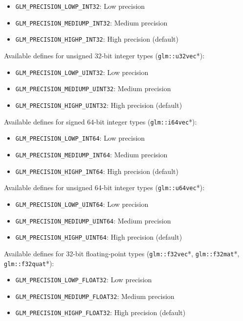 \documentclass{scrartcl}
\numberwithin{figure}{subsection}
\begin{document}
\begin{itemize}
    \item \verb|GLM_PRECISION_LOWP_INT32|: Low precision
    \item \verb|GLM_PRECISION_MEDIUMP_INT32|: Medium precision
    \item \verb|GLM_PRECISION_HIGHP_INT32|: High precision (default)
\end{itemize}

Available defines for unsigned 32-bit integer types (\verb|glm::u32vec|*):

\begin{itemize}
    \item \verb|GLM_PRECISION_LOWP_UINT32|: Low precision
    \item \verb|GLM_PRECISION_MEDIUMP_UINT32|: Medium precision
    \item \verb|GLM_PRECISION_HIGHP_UINT32|: High precision (default)
\end{itemize}

Available defines for signed 64-bit integer types (\verb|glm::i64vec|*):

\begin{itemize}
    \item \verb|GLM_PRECISION_LOWP_INT64|: Low precision
    \item \verb|GLM_PRECISION_MEDIUMP_INT64|: Medium precision
    \item \verb|GLM_PRECISION_HIGHP_INT64|: High precision (default)
\end{itemize}

Available defines for unsigned 64-bit integer types (\verb|glm::u64vec|*):

\begin{itemize}
    \item \verb|GLM_PRECISION_LOWP_UINT64|: Low precision
    \item \verb|GLM_PRECISION_MEDIUMP_UINT64|: Medium precision
    \item \verb|GLM_PRECISION_HIGHP_UINT64|: High precision (default)
\end{itemize}

Available defines for 32-bit floating-point types (\verb|glm::f32vec|*, \verb|glm::f32mat|*, \verb|glm::f32quat|*):

\begin{itemize}
    \item \verb|GLM_PRECISION_LOWP_FLOAT32|: Low precision
    \item \verb|GLM_PRECISION_MEDIUMP_FLOAT32|: Medium precision
    \item \verb|GLM_PRECISION_HIGHP_FLOAT32|: High precision (default)
\end{itemize}
\end{document}
